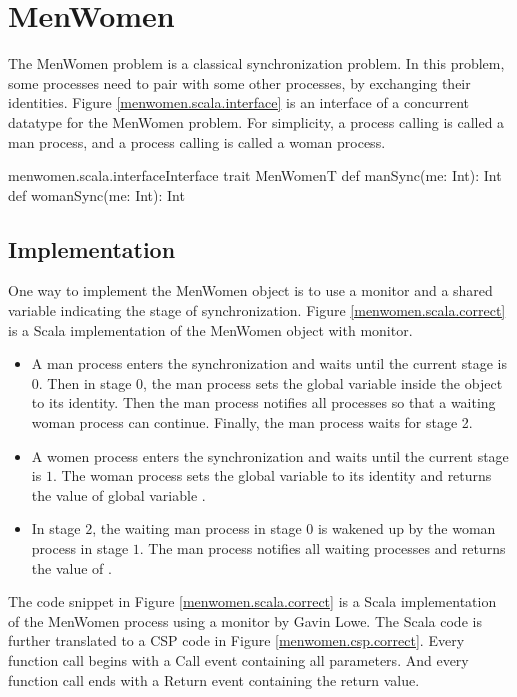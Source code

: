 \documentclass{article}
\begin{document}
\section{MenWomen}
The MenWomen problem is a classical synchronization problem. In this problem, some processes need to pair with some other processes, by exchanging their identities. Figure \ref{menwomen.scala.interface} is an interface of a concurrent datatype for the MenWomen problem. For simplicity, a process calling  is called a man process, and a process calling  is called a woman process. 

\begin{scalainline}{menwomen.scala.interface}{Interface}
trait MenWomenT{
  def manSync(me: Int): Int
  def womanSync(me: Int): Int
}
\end{scalainline}

\subsection{Implementation}
One way to implement the MenWomen object is to use a monitor and a shared variable indicating the stage of synchronization. Figure \ref{menwomen.scala.correct} is a Scala implementation of the MenWomen object with monitor.
\begin{itemize}
  \item A man process enters the synchronization and waits until the current stage is $0$. Then in stage $0$, the man process sets the global variable  inside the  object to its identity. Then the man process notifies all processes so that a waiting woman process can continue. Finally, the man process waits for stage 2.
  \item A women process enters the synchronization and waits until the current stage is $1$. The woman process sets the global variable  to its identity and returns the value of global variable .
  \item In stage $2$, the waiting man process in stage $0$ is wakened up by the woman process in stage $1$. The man process notifies all waiting processes and returns the value of .
\end{itemize}

The code snippet in Figure \ref{menwomen.scala.correct} is a Scala implementation of the MenWomen process using a monitor by Gavin Lowe. The Scala code is further translated to a CSP code in Figure \ref{menwomen.csp.correct}. Every function call begins with a Call event containing all parameters. And every function call ends with a Return event containing the return value.
\end{document}
